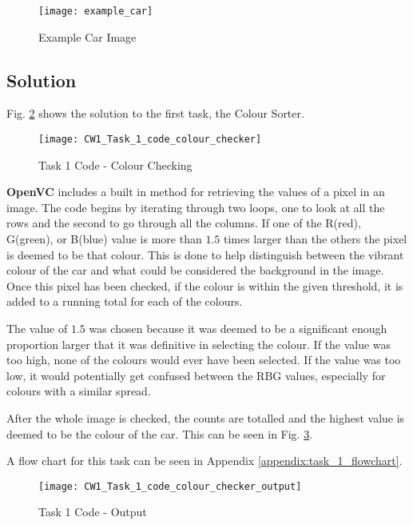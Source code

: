 \documentclass[conference]{IEEEtran}
\begin{document}
\begin{figure}
\centerline{\texttt{[image: example\_car]}}
\caption{Example Car Image}
\label{fig:example_car}
\end{figure}

\subsection{Solution}
Fig. \ref{fig:CW1_Task_1_code_colour_checker} shows the solution to the first task, the Colour Sorter.

\begin{figure}
\centerline{\texttt{[image: CW1\_Task\_1\_code\_colour\_checker]}}
\caption{Task 1 Code - Colour Checking}
\label{fig:CW1_Task_1_code_colour_checker}
\end{figure}

\textbf{OpenVC} includes a built in method for retrieving the values of a pixel in an image. The code begins by iterating through two loops, one to look at all the rows and the second to go through all the columns. If one of the R(red), G(green), or B(blue) value is more than $1.5$ times larger than the others the pixel is deemed to be that colour. This is done to help distinguish between the vibrant colour of the car and what could be considered the background in the image. Once this pixel has been checked, if the colour is within the given threshold, it is added to a running total for each of the colours.

The value of $1.5$ was chosen because it was deemed to be a significant enough proportion larger that it was definitive in selecting the colour. If the value was too high, none of the colours would ever have been selected. If the value was too low, it would potentially get confused between the RBG values, especially for colours with a similar spread.

After the whole image is checked, the counts are totalled and the highest value is deemed to be the colour of the car. This can be seen in Fig. \ref{fig:CW1_Task_1_code_colour_checker_output}.

A flow chart for this task can be seen in Appendix \ref{appendix:task_1_flowchart}.

\begin{figure}
\centerline{\texttt{[image: CW1\_Task\_1\_code\_colour\_checker\_output]}}
\caption{Task 1 Code - Output}
\label{fig:CW1_Task_1_code_colour_checker_output}
\end{figure}
\end{document}
